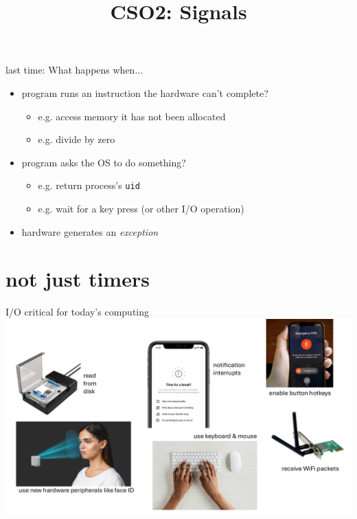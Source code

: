 \date{}
\title{CSO2: Signals}
\date{}







\begin{frame}{last time: What happens when...}
\begin{itemize}
\item program runs an instruction the hardware can't complete?
    \begin{itemize}
    \item e.g. access memory it has not been allocated
    \item e.g. divide by zero
    \end{itemize}
\vspace{.5cm}
\item program asks the OS to do something?
    \begin{itemize}
    \item e.g. return process's \texttt{uid}
    \item e.g. wait for a key press (or other I/O operation)
    \end{itemize}
\vspace{.5cm}
\item<2> \textrightarrow hardware generates an \textit{exception}
\end{itemize}
\end{frame}




\section{not just timers}

\begin{frame}{I/O critical for today's computing}
\includegraphics[width=0.9\pagewidth]{io.pdf}
\end{frame}

